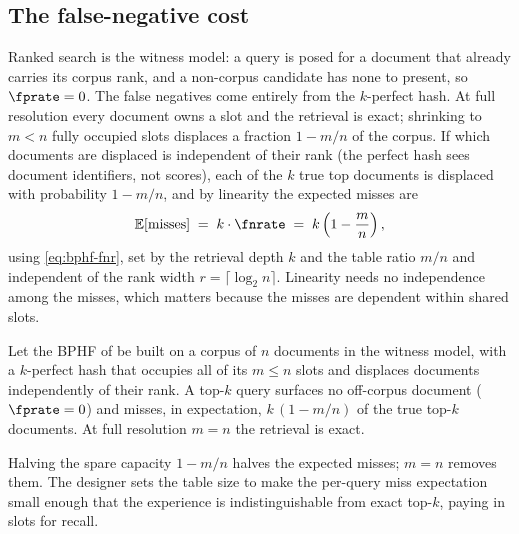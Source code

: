 \subsection*{The false-negative cost}

Ranked search is the witness model: a query is posed for a document that
already carries its corpus rank, and a non-corpus candidate has none to
present, so $\fprate = 0$. The false negatives come entirely from the
$k$-perfect hash. At full resolution every document owns a slot and the
retrieval is exact; shrinking to $m < n$ fully occupied slots displaces a
fraction $1 - m/n$ of the corpus. If which documents are displaced is
independent of their rank (the perfect hash sees document identifiers,
not scores), each of the $k$ true top documents is displaced with
probability $1 - m/n$, and by linearity the expected misses are
\begin{equation}
\label{eq:bphf-ranked-misses}
  \mathbb{E}[\text{misses}]
  \;=\; k \cdot \fnrate
  \;=\; k \left( 1 - \frac{m}{n} \right),
\end{equation}
using \eqref{eq:bphf-fnr}, set by the retrieval depth $k$ and the table
ratio $m/n$ and independent of the rank width $r = \lceil \log_2 n
\rceil$. Linearity needs no independence among the misses, which matters
because the misses are dependent within shared slots.

\begin{proposition}
\label{prop:bphf-ranked-search}
Let the BPHF of  be built on a corpus of $n$ documents in
the witness model, with a $k$-perfect hash that occupies all of its $m
\le n$ slots and displaces documents independently of their rank. A
top-$k$ query surfaces no off-corpus document ($\fprate = 0$) and misses,
in expectation, $k\,(1 - m/n)$ of the true top-$k$ documents. At full
resolution $m = n$ the retrieval is exact.
\end{proposition}

Halving the spare capacity $1 - m/n$ halves the expected misses; $m = n$
removes them. The designer sets the table size to make the per-query miss
expectation small enough that the experience is indistinguishable from
exact top-$k$, paying in slots for recall.

